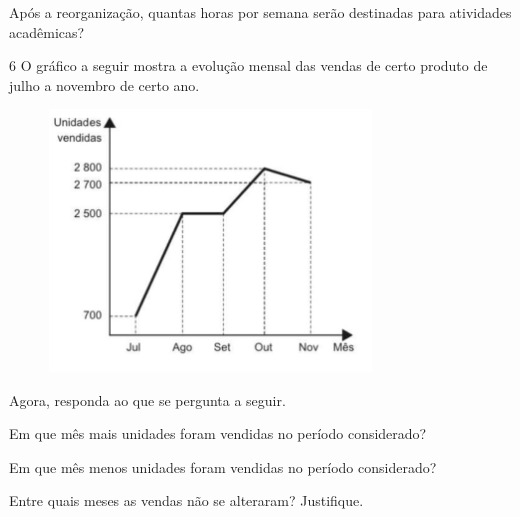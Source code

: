 {{{{Após a reorganização, quantas horas por semana serão destinadas para
atividades acadêmicas?








\num{6}  O gráfico a seguir mostra a evolução mensal das vendas de certo
produto de julho a novembro de certo ano.

\begin{figure}[H]
\centering\includegraphics[width=3.36458in,height=2.73558in]{./imgSAEB_6_MAT/media/image84.png}
\end{figure}

Agora, responda ao que se pergunta a seguir.

\begin{escolha}
\item Em que mês mais unidades foram vendidas no período considerado?


\item Em que mês menos unidades foram vendidas no período considerado?


\item Entre quais meses as vendas não se alteraram? Justifique.


\end{escolha}}}}}
